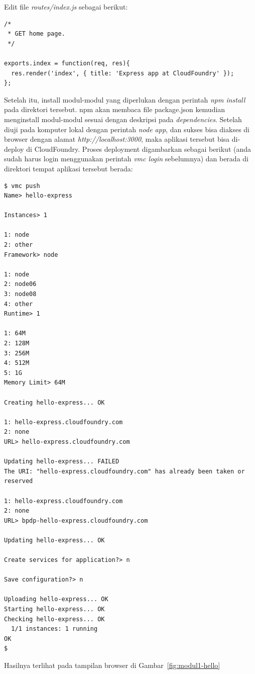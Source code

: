 Edit file \textit{routes/index.js} sebagai berikut:

\lstset{language=Javascript,caption=Hasil edit routes/index.js}
\begin{lstlisting}
/*
 * GET home page.
 */

exports.index = function(req, res){
  res.render('index', { title: 'Express app at CloudFoundry' });
};
\end{lstlisting}

Setelah itu, install modul-modul yang diperlukan dengan perintah \textit{npm install} pada direktori tersebut. npm akan membaca file package.json kemudian menginstall modul-modul sesuai dengan deskripsi pada \textit{dependencies}. Setelah diuji pada komputer lokal dengan perintah \textit{node app}, dan sukses bisa diakses di browser dengan alamat \textit{http://localhost:3000}, maka aplikasi tersebut bisa di-deploy di CloudFoundry. Proses deployment digambarkan sebagai berikut (anda sudah harus login menggunakan perintah \textit{vmc login} sebelumnya) dan berada di direktori tempat aplikasi tersebut berada:

\lstset{language=bash,caption=Deployment aplikasi ExpressJS ke CF}
\begin{lstlisting}
$ vmc push
Name> hello-express

Instances> 1

1: node
2: other
Framework> node

1: node
2: node06
3: node08
4: other
Runtime> 1

1: 64M
2: 128M
3: 256M
4: 512M
5: 1G
Memory Limit> 64M

Creating hello-express... OK

1: hello-express.cloudfoundry.com
2: none
URL> hello-express.cloudfoundry.com

Updating hello-express... FAILED
The URI: "hello-express.cloudfoundry.com" has already been taken or reserved

1: hello-express.cloudfoundry.com
2: none
URL> bpdp-hello-express.cloudfoundry.com

Updating hello-express... OK

Create services for application?> n

Save configuration?> n

Uploading hello-express... OK
Starting hello-express... OK
Checking hello-express... OK
  1/1 instances: 1 running
OK
$ 
\end{lstlisting}

Hasilnya terlihat pada tampilan browser di Gambar~\ref{fig:modul1-hello}

